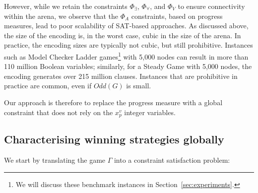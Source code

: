 \documentclass[a4paper,UKenglish,cleveref, autoref, thm-restate, anonymous]{lipics-v2021}
\begin{document}
However, while we retain the constraints $\Phi_\exists$, $\Phi_\forall$, and $\Phi_V$ to ensure connectivity within the arena, we observe that the $\Phi_A$ constraints, based on progress measures, lead to poor scalability of SAT-based approaches. 
As discussed above, the size of the encoding is, in the worst case, cubic in the size of the arena. In practice, the encoding sizes are typically not cubic, but still prohibitive. Instances such as Model Checker Ladder games\footnote{We will discuss these benchmark instances in Section~\ref{sec:experiments}.} with 5,000 nodes can result in more than 110 million Boolean variables; similarly, for a Steady Game with 5,000 nodes, the encoding generates over 215 million clauses.
Instances that are prohibitive in practice are common, even if $\textit{Odd}(G)$ is small. 



Our approach is therefore to replace the progress measure with a global constraint that does not rely on the $x_p^v$ integer variables.


\subsection{Characterising winning strategies globally}

We start by translating the game $\Gamma$ into a constraint satisfaction problem:
\end{document}
